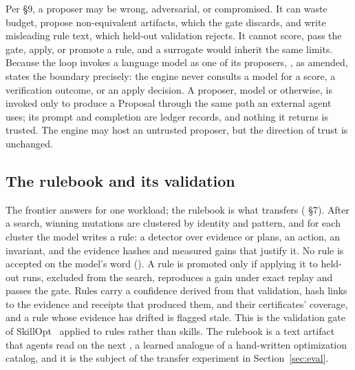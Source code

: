 Per  \S9, a proposer may be wrong, adversarial, or compromised.
It can waste budget, propose non-equivalent artifacts, which the gate discards, and
write misleading rule text, which held-out validation rejects. It cannot score,
pass the gate, apply, or promote a rule, and a surrogate would inherit the same
limits. Because the loop invokes a language model as one of its proposers,
, as amended, states the boundary precisely: the engine
never consults a model for a score, a verification outcome, or an apply
decision. A proposer, model or otherwise, is invoked only to produce a Proposal
through the same path an external agent uses; its prompt and completion are
ledger records, and nothing it returns is trusted. The engine may host an
untrusted proposer, but the direction of trust is unchanged.

\subsection{The rulebook and its validation}\label{sec:rulebook}

The frontier answers for one workload; the rulebook is what transfers
( \S7). After a search, winning mutations are clustered by
identity and pattern, and for each cluster the model writes a rule: a detector
over evidence or plans, an action, an invariant, and the evidence hashes and
measured gains that justify it. No rule is accepted on the model's word
(). A rule is promoted only if applying it to held-out runs, excluded
from the search, reproduces a gain under exact replay and passes the gate.
Rules carry a confidence derived from that validation, hash links to the
evidence and receipts that produced them, and their certificates' coverage, and
a rule whose evidence has drifted is flagged stale. This is the validation gate
of SkillOpt~\cite{skillopt} applied to rules rather than skills. The rulebook is
a text artifact that agents read on the next , a learned analogue of
a hand-written optimization catalog, and it is the subject of the transfer
experiment in Section~\ref{sec:eval}.

